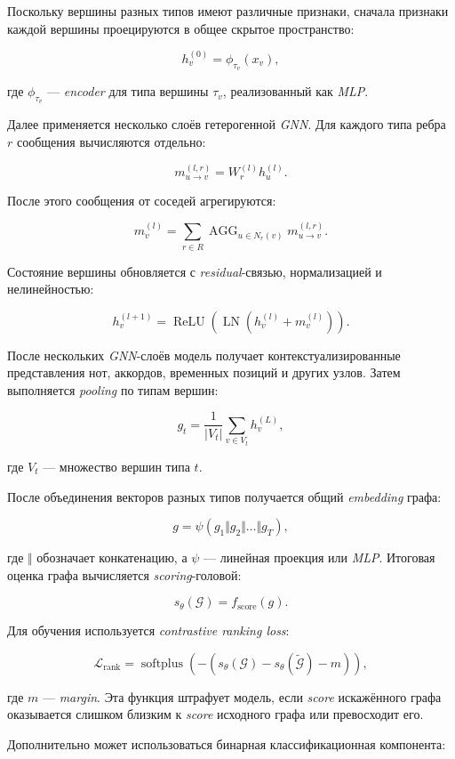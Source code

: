 \documentclass[a4paper,12pt]{extarticle}
\begin{document}
Поскольку вершины разных типов имеют различные признаки, сначала признаки каждой вершины проецируются в общее скрытое пространство:

\[
h_v^{(0)}=\phi_{\tau_v}(x_v),
\]

где $\phi_{\tau_v}$ --- \textit{encoder} для типа вершины $\tau_v$, реализованный как \textit{MLP}.

Далее применяется несколько слоёв гетерогенной \textit{GNN}. Для каждого типа ребра $r$ сообщения вычисляются отдельно:

\[
m_{u\to v}^{(l,r)}=W_r^{(l)}h_u^{(l)}.
\]

После этого сообщения от соседей агрегируются:

\[
m_v^{(l)}=\sum_{r\in R}\operatorname{AGG}_{u\in N_r(v)} m_{u\to v}^{(l,r)}.
\]

Состояние вершины обновляется с \textit{residual}-связью, нормализацией и нелинейностью:

\[
h_v^{(l+1)}=\operatorname{ReLU}\!\left(\operatorname{LN}\!\left(h_v^{(l)}+m_v^{(l)}\right)\right).
\]

После нескольких \textit{GNN}-слоёв модель получает контекстуализированные представления нот, аккордов, временных позиций и других узлов. Затем выполняется \textit{pooling} по типам вершин:

\[
g_t=\frac{1}{|V_t|}\sum_{v\in V_t}h_v^{(L)},
\]

где $V_t$ --- множество вершин типа $t$.

После объединения векторов разных типов получается общий \textit{embedding} графа:

\[
g=\psi\!\left(g_1\Vert g_2\Vert\ldots\Vert g_T\right),
\]

где $\Vert$ обозначает конкатенацию, а $\psi$ --- линейная проекция или \textit{MLP}. Итоговая оценка графа вычисляется \textit{scoring}-головой:

\[
s_\theta(\mathcal{G})=f_{\mathrm{score}}(g).
\]

Для обучения используется \textit{contrastive ranking loss}:

\[
\mathcal{L}_{\mathrm{rank}}=
\operatorname{softplus}\!\left(-\left(s_\theta(\mathcal{G})-s_\theta(\widetilde{\mathcal{G}})-m\right)\right),
\]

где $m$ --- \textit{margin}. Эта функция штрафует модель, если \textit{score} искажённого графа оказывается слишком близким к \textit{score} исходного графа или превосходит его.

Дополнительно может использоваться бинарная классификационная компонента:
\end{document}
